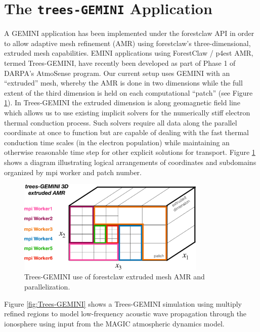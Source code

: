 \documentclass[11pt,letterpaper]{article}
\begin{document}
\section{The \texttt{trees-GEMINI} Application} \label{sec:tG}

A GEMINI application has been implemented under the forestclaw API in order to allow adaptive mesh refinement (AMR) using forestclaw's three-dimensional, extruded mesh capabilities.  EMINI applications using ForestClaw / p4est AMR, termed Trees-GEMINI, have recently been developed as part of Phase 1 of DARPA's AtmoSense program.  Our current setup uses GEMINI with an ``extruded'' mesh, whereby the AMR is done in two dimensions while the full extent of the third dimension is held on each computational ``patch'' (see Figure \ref{fig:parallel}).  In Trees-GEMINI the extruded dimension is along geomagnetic field line which allows us to use existing implicit solvers for the numerically stiff electron thermal conduction process.  Such solvers require all data along the parallel coordinate at once to function but are capable of dealing with the fast thermal conduction time scales (in the electron population) while maintaining an otherwise reasonable time step for other explicit solutions for transport.  Figure \ref{fig:parallel} shows a diagram illustrating logical arrangements of coordinates and subdomains organized by mpi worker and patch number.  
\begin{figure}
  \centering
  \includegraphics[width=0.8\textwidth]{./figures/GEMINI_parallel-crop.pdf}
  \caption{Trees-GEMINI use of forestclaw extruded mesh AMR and parallelization.}
  \label{fig:parallel}
\end{figure}

Figure \ref{fig:Trees-GEMINI} shows a Trees-GEMINI simulation using multiply refined regions to model low-frequency acoustic wave propagation through the ionosphere using input from the MAGIC atmospheric dynamics model.  
\end{document}
